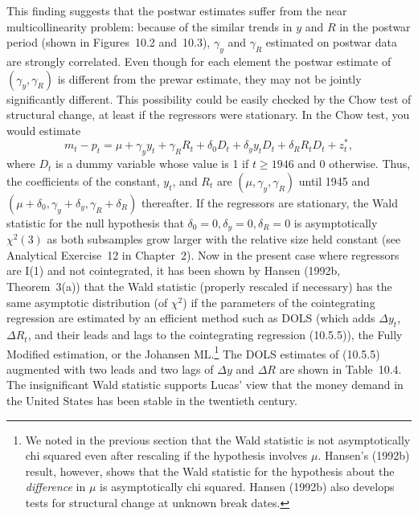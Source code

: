 This finding suggests that the postwar estimates suffer from the near multi\-collinearity
problem: because of the similar trends in $y$ and $R$ in the postwar period
(shown in Figures~10.2 and~10.3), $\gamma_y$ and $\gamma_R$ estimated on postwar data are strongly
correlated. Even though for each element the postwar estimate of $(\gamma_y, \gamma_R)$ is differ\-ent
from the prewar estimate, they may not be jointly significantly different. This
possibility could be easily checked by the Chow test of structural change, at least
if the regressors were stationary. In the Chow test, you would estimate
\begin{equation}
  m_t - p_t = \mu + \gamma_y y_t + \gamma_R R_t
    + \delta_0 D_t + \delta_y y_t D_t + \delta_R R_t D_t + z_t^*,
  \label{eq:10.5.5} \tag{10.5.5}
\end{equation}
where $D_t$ is a dummy variable whose value is 1 if $t \geq 1946$ and 0 otherwise.
Thus, the coefficients of the constant, $y_t$, and $R_t$ are $(\mu, \gamma_y, \gamma_R)$ until 1945 and
$(\mu + \delta_0, \gamma_y + \delta_y, \gamma_R + \delta_R)$ thereafter. If the regressors are stationary, the Wald
statistic for the null hypothesis that $\delta_0 = 0, \delta_y = 0, \delta_R = 0$ is asymptotically
$\chi^2(3)$ as both subsamples grow larger with the relative size held constant (see
Analytical Exercise~12 in Chapter~2). Now in the present case where regressors
are I(1) and not cointegrated, it has been shown by Hansen (1992b, Theorem~3(a))
that the Wald statistic (properly rescaled if necessary) has the same asymptotic
distribution (of $\chi^2$) if the parameters of the cointegrating regression are estimated
by an efficient method such as DOLS (which adds $\Delta y_t$, $\Delta R_t$, and their leads and
lags to the cointegrating regression (10.5.5)), the Fully Modified estimation, or the
Johansen ML.\footnote{%
We noted in the previous section that the Wald statistic is not asymptotically chi squared even after rescaling
if the hypothesis involves $\mu$. Hansen's (1992b) result, however, shows that the Wald statistic for the hypothesis
about the \emph{difference} in $\mu$ is asymptotically chi squared. Hansen (1992b) also develops tests for structural change
at unknown break dates.}
The DOLS estimates of (10.5.5) augmented with two leads and
two lags of $\Delta y$ and $\Delta R$ are shown in Table~10.4. The insignificant Wald statistic
supports Lucas' view that the money demand in the United States has been stable
in the twentieth century.


